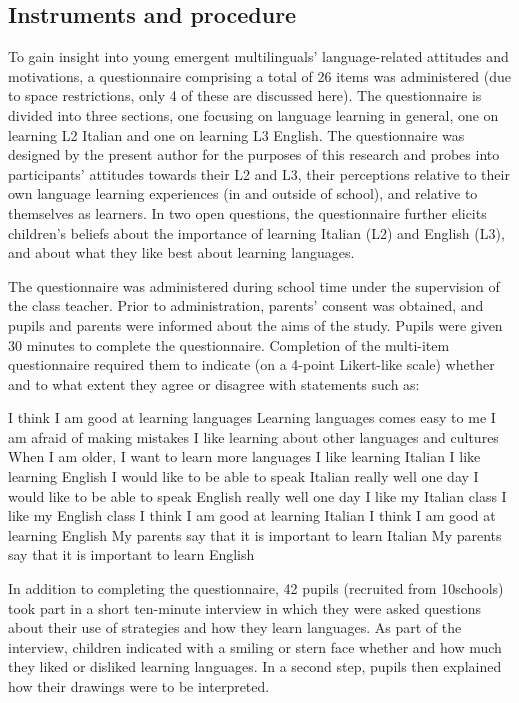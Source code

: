 \documentclass[output=paper]{../langscibook}
\begin{document}
\largerpage
\subsection{Instruments and procedure}


To gain insight into young emergent multilinguals’ language-related attitudes and motivations, a questionnaire comprising a total of 26 items was administered (due to space restrictions, only 4 of these are discussed here). The questionnaire is divided into three sections, one focusing on language learning in general, one on learning L2 Italian and one on learning L3 English. The questionnaire was designed by the present author for the purposes of this research and probes into participants’ attitudes towards their L2 and L3, their perceptions relative to their own language learning experiences (in and outside of school), and relative to themselves as learners. In two open questions, the questionnaire further elicits children’s beliefs about the importance of learning Italian (L2) and English (L3), and about what they like best about learning languages.

The questionnaire was administered during school time under the supervision of the class teacher. Prior to administration, parents’ consent was obtained, and pupils and parents were informed about the aims of the study. Pupils were given 30 minutes to complete the questionnaire. Completion of the multi-item questionnaire required them to indicate (on a 4-point Likert-like scale) whether and to what extent they agree or disagree with statements such as:

\ea
\ea I think I am good at learning languages
\ex Learning languages comes easy to me
\ex I am afraid of making mistakes
\ex I like learning about other languages and cultures
\ex When I am older, I want to learn more languages
\ex I like learning Italian
\ex I like learning English
\ex I would like to be able to speak Italian really well one day
\ex I would like to be able to speak English really well one day 
\ex I like my Italian class
\ex I like my English class
\ex I think I am good at learning Italian
\ex I think I am good at learning English 
\ex My parents say that it is important to learn Italian
\ex My parents say that it is important to learn English 
\z
\z

In addition to completing the questionnaire, 42 pupils (recruited from 10\linebreak schools) took part in a short ten-minute interview in which they were asked questions about their use of strategies and how they learn languages. As part of the interview, children indicated with a smiling or stern face whether and how much they liked or disliked learning languages. In a second step, pupils then explained how their drawings were to be interpreted. 
\end{document}
